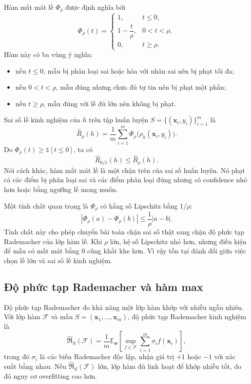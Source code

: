 Hàm mất mát lề $\Phi_\rho$ được định nghĩa bởi
\[
  \Phi_\rho(t)=
  \begin{cases}
    1, & t\leq 0,\\
    1-\dfrac{t}{\rho}, & 0<t<\rho,\\
    0, & t\geq \rho.
  \end{cases}
\]
Hàm này có ba vùng ý nghĩa:
\begin{itemize}[leftmargin=2em]
  \item nếu $t\leq 0$, mẫu bị phân loại sai hoặc hòa với nhãn sai nên bị phạt tối đa;
  \item nếu $0<t<\rho$, mẫu đúng nhưng chưa đủ tự tin nên bị phạt một phần;
  \item nếu $t\geq\rho$, mẫu đúng với lề đủ lớn nên không bị phạt.
\end{itemize}

Sai số lề kinh nghiệm của $h$ trên tập huấn luyện $S=\{(\bm{x}_i,y_i)\}_{i=1}^{m}$ là
\[
  \widehat{R}_{\rho}(h)=\frac{1}{m}\sum_{i=1}^{m}\Phi_\rho\bigl(\rho_h(\bm{x}_i,y_i)\bigr).
\]
Do $\Phi_\rho(t)\geq\mathbb{1}[t\leq 0]$, ta có
\[
  \widehat{R}_{0/1}(h)\leq \widehat{R}_{\rho}(h).
\]
Nói cách khác, hàm mất mát lề là một chặn trên của sai số huấn luyện. Nó phạt cả các điểm bị phân loại sai và các điểm phân loại đúng nhưng có confidence nhỏ hơn hoặc bằng ngưỡng lề mong muốn.

Một tính chất quan trọng là $\Phi_\rho$ có hằng số Lipschitz bằng $1/\rho$:
\[
  |\Phi_\rho(a)-\Phi_\rho(b)|\leq \frac{1}{\rho}|a-b|.
\]
Tính chất này cho phép chuyển bài toán chặn sai số thật sang chặn độ phức tạp Rademacher của lớp hàm lề. Khi $\rho$ lớn, hệ số Lipschitz nhỏ hơn, nhưng điều kiện để mẫu có mất mát bằng 0 cũng khắt khe hơn. Vì vậy tồn tại đánh đổi giữa việc chọn lề lớn và sai số lề kinh nghiệm.


\subsection{Độ phức tạp Rademacher và hàm max}

Độ phức tạp Rademacher đo khả năng một lớp hàm khớp với nhiễu ngẫu nhiên. Với lớp hàm $\mathcal{F}$ và mẫu $S=(\bm{x}_1,\ldots,\bm{x}_m)$, độ phức tạp Rademacher kinh nghiệm là
\[
  \widehat{\mathfrak{R}}_S(\mathcal{F})=\frac{1}{m}\mathbb{E}_{\bm{\sigma}}
  \left[\sup_{f\in\mathcal{F}}\sum_{i=1}^{m}\sigma_i f(\bm{x}_i)\right],
\]
trong đó $\sigma_i$ là các biến Rademacher độc lập, nhận giá trị $+1$ hoặc $-1$ với xác suất bằng nhau. Nếu $\widehat{\mathfrak{R}}_S(\mathcal{F})$ lớn, lớp hàm đủ linh hoạt để khớp nhiễu tốt, do đó nguy cơ overfitting cao hơn.

